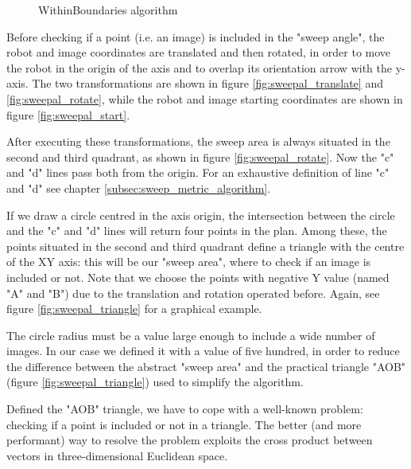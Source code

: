 \begin{figure}[htp]
\begin{center}
    \vspace*{20pt}

  \end{center}
  \caption{WithinBoundaries algorithm}
  \label{fig:withingboundaries}
\end{figure}

%
Before checking if a point (i.e. an image) is included in the "sweep angle", the robot and image coordinates
are translated and then rotated, in order to move the robot in the origin of the axis and to overlap its
orientation arrow with the y-axis. The two transformations are shown in figure \ref{fig:sweepal_translate} and
\ref{fig:sweepal_rotate}, while the robot and image starting coordinates are shown in figure \ref{fig:sweepal_start}.
%

%
After executing these transformations, the sweep area is always situated in the second and third quadrant, as
shown in figure \ref{fig:sweepal_rotate}. Now the "c" and "d" lines pass both from the origin. For an exhaustive
definition of line "c" and "d" see chapter \ref{subsec:sweep_metric_algorithm}.
%

%
If we draw a circle centred in the axis origin, the intersection between the circle and the "c" and "d" lines will
return four points in the plan. Among these, the points situated in the second and third quadrant define a triangle
with the centre of the XY axis: this will be our "sweep area", where to check if an image is included or not. Note
that we choose the points with negative Y value (named "A" and "B") due to the translation and rotation operated
before. Again, see figure \ref{fig:sweepal_triangle} for a graphical example.
%

%
The circle radius must be a value large enough to include a wide number of images. In our case we defined it with a
value of five hundred, in order to reduce the difference between the abstract "sweep area" and the practical triangle
"AOB" (figure \ref{fig:sweepal_triangle}) used to simplify the algorithm.
%

%
Defined the "AOB" triangle, we have to cope with a well-known problem: checking if a point is included or not in a
triangle. The better (and more performant) way to resolve the problem exploits the cross product between vectors
in three-dimensional Euclidean space.
%

